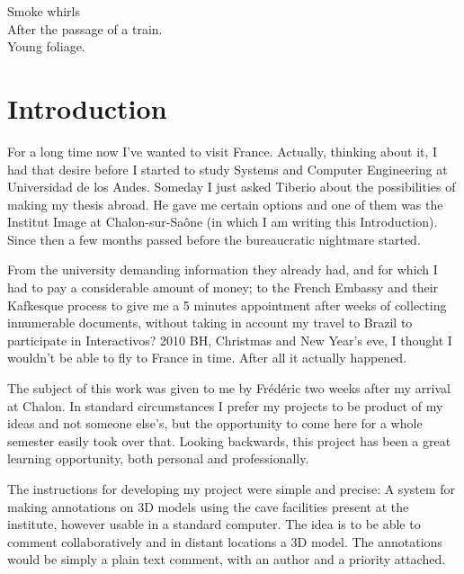 %
\begin{savequote}[10pc]
\sffamily
Smoke whirls\\
After the passage of a train.\\
Young foliage.
\end{savequote}
\chapter{Introduction}
For a long time now I've wanted to visit France. Actually, thinking about it, I had that desire before I started to study Systems and Computer Engineering at Universidad de los Andes. Someday I just asked Tiberio about the possibilities of making my thesis abroad. He gave me certain options and one of them was the Institut Image at Chalon-sur-Saône (in which I am writing this Introduction). Since then a few months passed before the bureaucratic nightmare started. 

From the university demanding information they already had, and for which I had to pay a considerable amount of money; to the French Embassy and their Kafkesque process to give me a 5 minutes appointment after weeks of collecting innumerable documents, without taking in account my travel to Brazil to participate in Interactivos? 2010 BH, Christmas and New Year's eve, I thought I wouldn't be able to fly to France in time.  After all it actually happened.

The subject of this work was given to me by Frédéric two weeks after my arrival at Chalon. In standard circumstances I prefer my projects to be product of my ideas and not someone else's, but the opportunity to come here for a whole semester easily took over that. Looking backwards, this project has been a great learning opportunity, both personal and professionally.


The instructions for developing my project were simple and precise: A system for making annotations on 3D models using the cave facilities present at the institute, however usable in a standard computer. The idea is to be able to comment collaboratively and in distant locations a 3D model. The annotations would be simply a plain text comment, with an author and a priority attached. 

